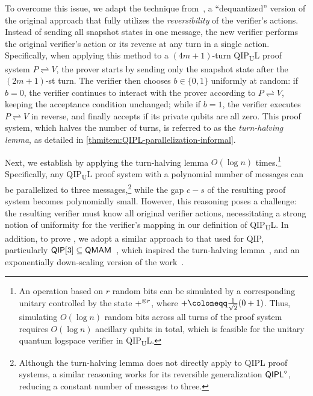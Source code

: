 \documentclass[11pt, a4paper]{article}
\numberwithin{equation}{section}
\numberwithin{figure}{section}
\newcommand{\QIP}{\textnormal{\textsf{QIP}}\xspace}
\newcommand{\QMAM}{\textnormal{\textsf{QMAM}}\xspace}
\newcommand{\QIPL}{\textnormal{\textsf{QIPL}}\xspace}
\newcommand{\QIPUL}{\texorpdfstring{\textnormal{\textsf{QIP}\textsubscript{\textnormal{U}}\textsf{L}}}\xspace}
\newcommand{\protocol}[2]{{#1}\!\rightleftharpoons\!{#2}}
\let\ket\relax\DeclarePairedDelimiter\ket{\lvert}{\rangle}
\newcommand{\binset}{\{0,1\}}
\begin{document}
To overcome this issue, we adapt the technique from~\cite[Section 4]{KKMV09}, a ``dequantized'' version of the original approach that fully utilizes the \textit{reversibility} of the verifier's actions. Instead of sending all snapshot states in one message, the new verifier performs the original verifier's action or its reverse at any turn in a single action. Specifically, when applying this method to a $(4m+1)$-turn \QIPUL{} proof system $\protocol{P}{V}$, the prover starts by sending only the snapshot state after the $(2m+1)$-st turn. The verifier then chooses $b\in\binset$ uniformly at random: if $b=0$, the verifier continues to interact with the prover according to $\protocol{P}{V}$, keeping the acceptance condition unchanged; while if $b=1$, the verifier executes $\protocol{P}{V}$ in reverse, and finally accepts if its private qubits are all zero.
This proof system, which halves the number of turns, is referred to as the \textit{turn-halving lemma}, as detailed in \ref{thmitem:QIPL-parallelization-informal}.

Next, we establish  by applying the turn-halving lemma $O(\log n)$ times.\footnote{An operation based on $r$ random bits can be simulated by a corresponding unitary controlled by the state $\ket{+}^{\otimes r}$, where $\ket{+} \coloneqq \frac{1}{\sqrt{2}}(\ket{0}+\ket{1})$. Thus, simulating $O(\log n)$ random bits across all turns of the proof system requires $O(\log n)$ ancillary qubits in total, which is feasible for the unitary quantum logspace verifier in \QIPUL{}.\label{footref:simulating-random-bits}} Specifically, any \QIPUL{} proof system with a polynomial number of messages can be parallelized to three messages,\footnote{Although the turn-halving lemma does not directly apply to \QIPL{} proof systems, a similar reasoning works for its reversible generalization $\QIPL^{\diamond}$, reducing a constant number of messages to three.} while the gap $c-s$ of the resulting proof system becomes polynomially small. 
However, this reasoning poses a challenge: the resulting verifier must know all original verifier actions, necessitating a strong notion of uniformity for the verifier's mapping in our definition of \QIPUL{}. 
In addition, to prove , we adopt a similar approach to that used for \QIP{}, particularly $\QIP[3] \subseteq \QMAM{}$~\cite{MW05}, which inspired the turn-halving lemma~\cite[Section 4]{KKMV09}, and an exponentially down-scaling version of the work~\cite{JJUW11}. 
\end{document}
